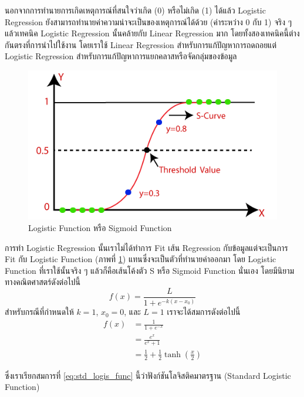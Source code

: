 นอกจากการทำนายการเกิดเหตุการณ์ที่สนใจว่าเกิด (0) หรือไม่เกิด (1) ได้แล้ว Logistic Regression ยังสามารถทำนายค่าความน่าจะเป็นของเหตุการณ์ได้ด้วย (ค่าระหว่าง 0 กับ 1) จริง ๆ แล้วเทคนิค Logistic Regression นั้นคล้ายกับ Linear Regression มาก โดยทั้งสองเทคนิคนี้ต่างกันตรงที่การนำไปใช้งาน โดยเราใช้ Linear Regression สำหรับการแก้ปัญหาการถดถอยแต่ Logistic Regression สำหรับการแก้ปัญหาการแยกคลาสหรือจัดกลุ่มของข้อมูล

\begin{figure}[H]
    \centering
    \includegraphics[width=0.6\linewidth]{fig/s_curve_logistic_func.png}
    \caption{Logistic Function หรือ Sigmoid Function}
    \label{fig:s_curve_logistic}
\end{figure}

การทำ Logistic Regression นั้นเราไม่ได้ทำการ Fit เส้น Regression กับข้อมูลแต่จะเป็นการ Fit กับ Logistic Function (ภาพที่ \ref{fig:s_curve_logistic}) แทนซึ่งจะเป็นตัวที่ทำนายค่าออกมา โดย Logistic Function ที่เราใช้นั้นจริง ๆ แล้วก็คือเส้นโค้งตัว S หรือ Sigmoid Function นั่นเอง โดยมีนิยามทางคณิตศาสตร์ดังต่อไปนี้
%
\begin{equation}\label{eq:logistic_func}
    f(x) = \frac{L}{1 + e^{-k(x-x_0)}}
\end{equation}
%
\noindent สำหรับกรณีที่กำหนดให้ $k = 1$, $x_{0} = 0$, และ $L = 1$ เราจะได้สมการดังต่อไปนี้
%
\begin{align}\label{eq:std_logis_func}
    f(x) & = \frac{1}{1 + e^{-x}} \nonumber                  \\
         & = \frac{e^x}{e^x + 1} \nonumber                   \\
         & = \frac12 + \frac12 \tanh\left(\frac{x}{2}\right)
\end{align}

\noindent ซึ่งเราเรียกสมการที่ \eqref{eq:std_logis_func} นี้ว่าฟังก์ชันโลจิสติคมาตรฐาน (Standard Logistic Function)

